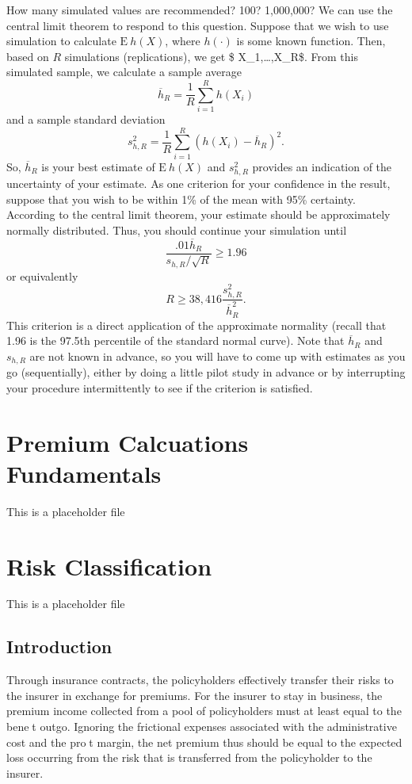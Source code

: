 \documentclass[]{book}
\theoremstyle{definition}
\theoremstyle{definition}
\theoremstyle{definition}
\theoremstyle{remark}
\begin{document}
How many simulated values are recommended? 100? 1,000,000? We can use
the central limit theorem to respond to this question. Suppose that we
wish to use simulation to calculate \(\mathrm{E~}h(X)\), where
\(h(\cdot)\) is some known function. Then, based on \(R\) simulations
(replications), we get \$ X\_1,\ldots,X\_R\$. From this simulated
sample, we calculate a sample average
\[\overline{h}_R=\frac{1}{R}\sum_{i=1}^{R} h(X_i)\] and a sample
standard deviation
\[s_{h,R}^2 = \frac{1}{R} \sum_{i=1}^{R}\left( h(X_i) -\overline{h}_R
\right) ^2.\] So, \(\overline{h}_R\) is your best estimate of
\(\mathrm{E~}h(X)\) and \(s_{h,R}^2\) provides an indication of the
uncertainty of your estimate. As one criterion for your confidence in
the result, suppose that you wish to be within 1\% of the mean with 95\%
certainty. According to the central limit theorem, your estimate should
be approximately normally distributed. Thus, you should continue your
simulation until \[\frac{.01\overline{h}_R}{s_{h,R}/\sqrt{R}}\geq 1.96\]
or equivalently \[R \geq 38,416\frac{s_{h,R}^2}{\overline{h}_R^2}.\]
This criterion is a direct application of the approximate normality
(recall that 1.96 is the 97.5th percentile of the standard normal
curve). Note that \(\overline{h}_R\) and \(s_{h,R}\) are not known in
advance, so you will have to come up with estimates as you go
(sequentially), either by doing a little pilot study in advance or by
interrupting your procedure intermittently to see if the criterion is
satisfied.

\chapter{Premium Calcuations Fundamentals}\label{C:PremCalc}

This is a placeholder file

\chapter{Risk Classification}\label{C:RiskClass}

This is a placeholder file

\section{Introduction}\label{introduction}

Through insurance contracts, the policyholders effectively transfer
their risks to the insurer in exchange for premiums. For the insurer to
stay in business, the premium income collected from a pool of
policyholders must at least equal to the benet outgo. Ignoring the
frictional expenses associated with the administrative cost and the
prot margin, the net premium thus should be equal to the expected loss
occurring from the risk that is transferred from the policyholder to the
insurer.
\end{document}
